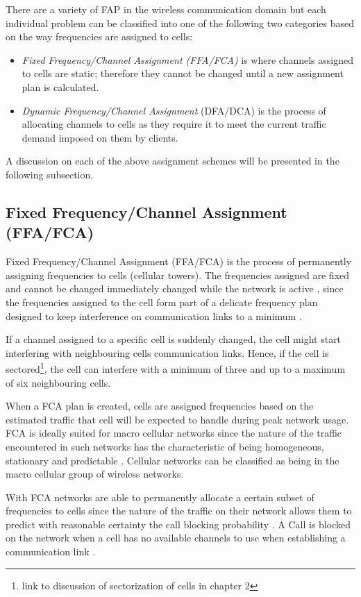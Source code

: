 There are a variety of FAP in the wireless communication domain but each individual problem can be classified into one of the following two categories based on the way frequencies are assigned to cells:
\begin{itemize}
\item \emph{Fixed Frequency/Channel Assignment (FFA/FCA)} is where channels assigned to cells are static; therefore they cannot be changed until a new assignment plan is calculated.
\item \emph{Dynamic Frequency/Channel Assignment} (DFA/DCA) is the process of allocating channels to cells as they require it to meet the current traffic demand imposed on them by clients. 
\end{itemize}

A discussion on each of the above assignment schemes will be presented in the following subsection.
\subsection{Fixed Frequency/Channel Assignment (FFA/FCA)}
Fixed Frequency/Channel Assignment (FFA/FCA) is the process of permanently assigning frequencies to cells (cellular towers). The frequencies assigned are fixed and cannot be changed immediately changed while the network is active , since the frequencies assigned to the cell form part of a delicate frequency plan designed to keep interference on communication links to a minimum \cite{PrinciplesMobileCommunication}. 

If a channel assigned to a specific cell is suddenly changed, the cell might start interfering with neighbouring cells communication links. Hence, if the cell is sectored\footnote{link to discussion of sectorization of cells in chapter 2}, the cell can interfere with a minimum of three and up to a maximum of six neighbouring cells\cite{PrinciplesMobileCommunication}.

When a FCA plan is created, cells are assigned frequencies based on the estimated traffic that cell will be expected to handle during peak network usage. FCA is ideally suited for macro cellular networks since the nature of the traffic encountered in such networks has the characteristic of being homogeneous, stationary and predictable \cite{PrinciplesMobileCommunication}. Cellular networks can be classified as being in the macro cellular group of wireless networks.

With FCA networks are able to permanently allocate a certain subset of frequencies to cells since the nature of the traffic on their network allows them to predict with reasonable certainty the call blocking probability \cite{PrinciplesMobileCommunication}. A Call is blocked on the network when a cell has no available channels to use when establishing a communication link \cite{PrinciplesMobileCommunication}.

